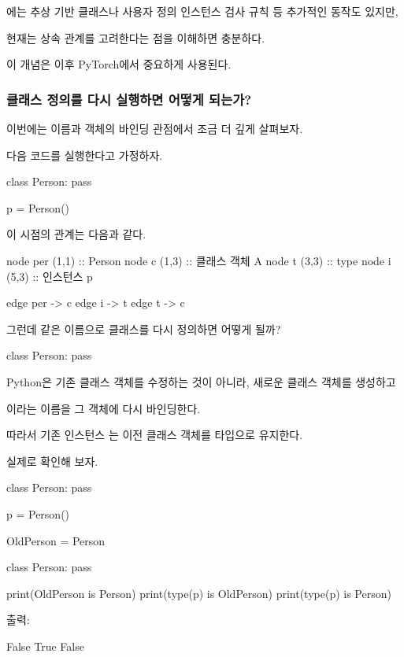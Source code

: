 에는 추상 기반 클래스나 사용자 정의 인스턴스 검사 규칙 등 추가적인 동작도 있지만,

현재는 상속 관계를 고려한다는 점을 이해하면 충분하다.

이 개념은 이후 PyTorch에서 중요하게 사용된다.

\subsubsection{클래스 정의를 다시 실행하면 어떻게 되는가?}

이번에는 이름과 객체의 바인딩 관점에서 조금 더 깊게 살펴보자.

다음 코드를 실행한다고 가정하자.

\begin{dhkcode}
class Person:
    pass

p = Person()
\end{dhkcode}

이 시점의 관계는 다음과 같다.

\begin{dhkdiagram}[in=6]
node per (1,1) :: Person
node c (1,3) :: 클래스 객체 A
node t (3,3) :: type
node i (5,3) :: 인스턴스 p

edge per -> c
edge i -> t
edge t -> c
\end{dhkdiagram}

그런데 같은 이름으로 클래스를 다시 정의하면 어떻게 될까?

\begin{dhkcode}
class Person:
    pass
\end{dhkcode}

Python은 기존 클래스 객체를 수정하는 것이 아니라, 새로운 클래스 객체를 생성하고

이라는 이름을 그 객체에 다시 바인딩한다.

따라서 기존 인스턴스 는 이전 클래스 객체를 타입으로 유지한다.

실제로 확인해 보자.

\begin{dhkcode}
class Person:
    pass

p = Person()

OldPerson = Person

class Person:
    pass


print(OldPerson is Person)
print(type(p) is OldPerson)
print(type(p) is Person)
\end{dhkcode}

출력:

\begin{dhkzsh}
False
True
False
\end{dhkzsh}

